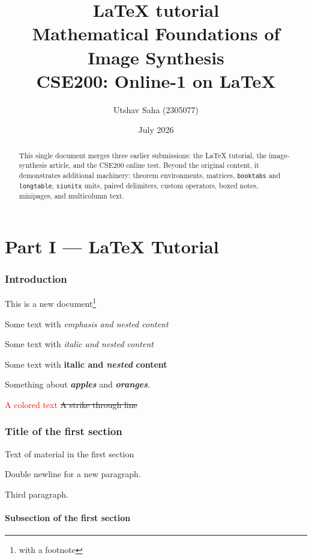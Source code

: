 \documentclass[11pt,a4paper]{article}
\title{\textbf{\LaTeX} tutorial \\[0.4em]
       \large Mathematical Foundations of Image Synthesis \\
       \large CSE200: Online-1 on \LaTeX}
\author{Utshav Saha (2305077)}
\date{July 2026}
\newcommand\kw[1]{\textbf{\itshape #1}}          %
\theoremstyle{plain}
\theoremstyle{definition}
\theoremstyle{remark}
\begin{document}
\maketitle %

\begin{abstract}
\noindent This single document merges three earlier submissions: the \LaTeX{}
tutorial, the image-synthesis article, and the CSE200 online test. Beyond the
original content, it demonstrates additional machinery: theorem environments,
matrices, \texttt{booktabs} and \texttt{longtable}, \texttt{siunitx} units,
paired delimiters, custom operators, boxed notes, minipages, and multicolumn
text.
\end{abstract}

\tableofcontents
\listoffigures
\listoftables

\newpage

\part*{Part I --- \LaTeX{} Tutorial}

\section{Introduction}
This is a
new document\footnote{with a footnote}

Some text with \emph{emphasis and \emph{nested} content}

Some text with \textit{italic and \textit{nested} content}

Some text with \textbf{italic and \textit{nested} content}

Something about \kw{apples} and \kw{oranges}.

\textcolor{red}{A colored text}
\sout{A strike through line}

\section{Title of the first section}

Text of material in the first section

Double newline for a new paragraph.

Third paragraph.

\subsection{Subsection of the first section}
\end{document}
